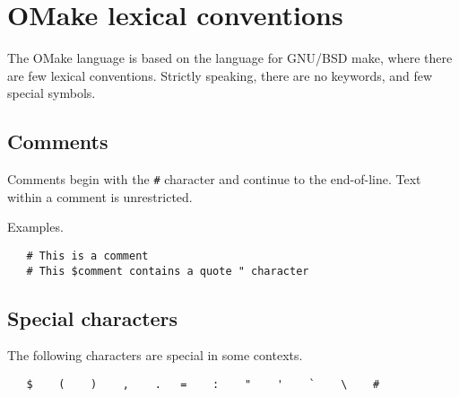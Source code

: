 %
%
\section{OMake lexical conventions}

The OMake language is based on the language for GNU/BSD make, where there are few lexical
conventions.  Strictly speaking, there are no keywords, and few special symbols.

\subsection{Comments}

Comments begin with the \verb+#+ character and continue to the end-of-line.
Text within a comment is unrestricted.

Examples.

\begin{verbatim}
   # This is a comment
   # This $comment contains a quote " character
\end{verbatim}

\subsection{Special characters}

The following characters are special in some contexts.

\begin{verbatim}
   $    (    )    ,    .   =    :    "    '    `    \    #
\end{verbatim}

